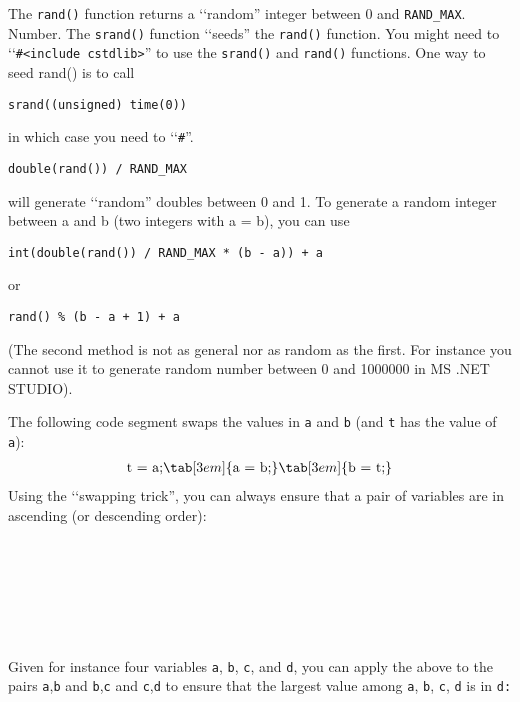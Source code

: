 The \texttt{rand()} function returns a \lq\lq random'' integer between 0 and
\texttt{RAND\_MAX}. Number. The \texttt{srand()} function \lq\lq seeds'' the
\texttt{rand()} function. You might need to \lq\lq \texttt{\#<include
 cstdlib>}'' to use the \texttt{srand()} and
\texttt{rand()} functions. One way to seed rand() is to call
\begin{center}
\texttt{srand((unsigned) time(0))}
\end{center}
in which case you need to \lq\lq \texttt{\#<include  ctime>}''.
\begin{center}
\texttt{double(rand()) / RAND\_MAX}
\end{center}
will generate \lq\lq random'' doubles between 0 and 1. To generate a random
integer between a and b (two integers with a = b), you can use
\begin{center}
\texttt{int(double(rand()) / RAND\_MAX * (b - a)) + a}
\end{center}
or
\begin{center}
\texttt{rand() \% (b - a + 1) + a}
\end{center}
(The second method is not as general nor as random as the first. For
instance you cannot use it to generate random number between 0 and
1000000 in MS .NET STUDIO).

The following code segment swaps the values in \texttt{a} and \texttt{b}
(and \texttt{t} has the value of \texttt{a}):
\begin{align*}
&\text{t = a;} \tab[3em]{\text{a = b;}} \tab[3em]{\text{b = t;}}\\
\end{align*}
Using the \lq\lq swapping trick'', you can always ensure that a pair of
variables are in ascending (or descending order):

\\
\tab[3em]{\{}\\
\\
\\
\\
\tab[3em]{\}}\\

Given for instance four variables \texttt{a}, \texttt{b}, \texttt{c}, and
\texttt{d}, you can apply the above to the pairs \texttt{a},\texttt{b} and
\texttt{b},\texttt{c} and \texttt{c},\texttt{d} to ensure that the largest value
among \texttt{a}, \texttt{b}, \texttt{c}, \texttt{d} is in \texttt{d:}

\\
\\
\\

